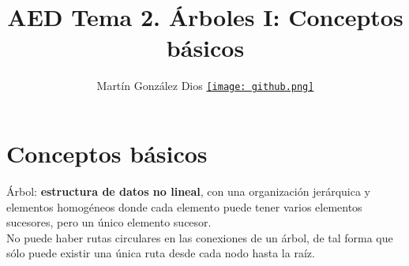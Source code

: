 \documentclass{article}
\title{AED Tema 2. Árboles I: Conceptos básicos}
\author{Martín González Dios 
\href{https://github.com/martindios}{\texttt{[image: github.png]}}}
\begin{document}
\maketitle

\section{Conceptos básicos}
Árbol: \textbf{estructura de datos no lineal}, con una organización jerárquica y elementos homogéneos donde cada elemento puede tener varios elementos sucesores, pero un único elemento sucesor. \\
No puede haber rutas circulares en las conexiones de un árbol, de tal forma que sólo puede existir una única ruta desde cada nodo hasta la raíz. \\
\end{document}

